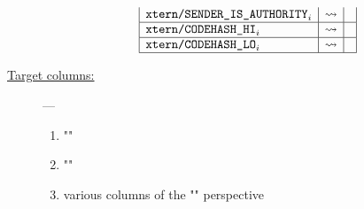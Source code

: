 \begin{description}
\[\begin{array}{|l|c|l|}
				\texttt{xtern}\texttt{/}\texttt{\texttt{SENDER\_IS\_}\texttt{AUTHORITY}}      _{i}     & \rightsquigarrow &                                \\ \hline
				\texttt{xtern}\texttt{/}\texttt{\texttt{CODEHASH}}\texttt{\_HI} _{i}     & \rightsquigarrow &                                \\ \hline
				\texttt{xtern}\texttt{/}\texttt{\texttt{CODEHASH}}\texttt{\_LO} _{i}     & \rightsquigarrow &                                \\ \hline
			\end{array}
		\]
	\item[\underline{Target columns:}] ---
		\begin{multicols}{2}
			\begin{enumerate}
				\item "" %
				\item "" %
				\item various  columns of the "" perspective
			\end{enumerate}
		\end{multicols}
\end{description}
